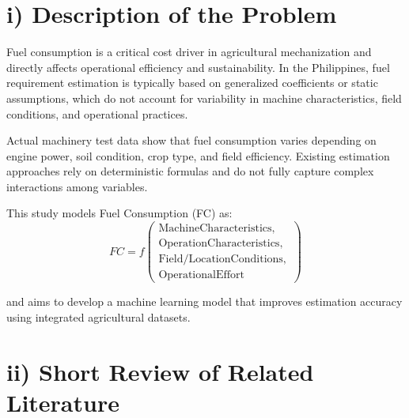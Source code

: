\documentclass[10pt,twocolumn]{article}
\begin{document}

\section*{\small i) Description of the Problem}

Fuel consumption is a critical cost driver in agricultural mechanization and directly affects operational efficiency and sustainability. In the Philippines, fuel requirement estimation is typically based on generalized coefficients or static assumptions, which do not account for variability in machine characteristics, field conditions, and operational practices.

\vspace{10pt}

Actual machinery test data show that fuel consumption varies depending on engine power, soil condition, crop type, and field efficiency. Existing estimation approaches rely on deterministic formulas and do not fully capture complex interactions among variables.

\vspace{10pt}

This study models Fuel Consumption (FC) as:
{\small
\[
FC = f\!\left(
\begin{array}{l}
\mathrm{Machine Characteristics,}\\
\mathrm{Operation Characteristics,}\\
\mathrm{Field/Location Conditions,}\\
\mathrm{Operational Effort}
\end{array}
\right)
\]
}

and aims to develop a machine learning model that improves estimation accuracy using integrated agricultural datasets.

\vspace{10pt}

\section*{\small ii) Short Review of Related Literature}
\end{document}
